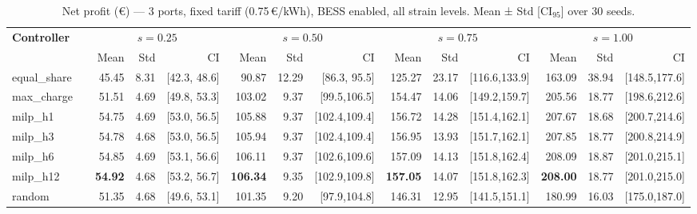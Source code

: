 \begin{table}[!htb]
\centering
\caption{Net profit (€) — 3 ports, fixed tariff (0.75\,€/kWh), BESS enabled,
         all strain levels. Mean ± Std [CI$_{95}$] over 30 seeds.}
\label{tab:gc_3port_fixed}
\setlength{\tabcolsep}{3pt}
\begin{tabular}{lp{1cm} rrr rrr rrr rrr}
\toprule
\textbf{Controller} & &
  \multicolumn{3}{c}{$s=0.25$} &
  \multicolumn{3}{c}{$s=0.50$} &
  \multicolumn{3}{c}{$s=0.75$} &
  \multicolumn{3}{c}{$s=1.00$} \\
\cmidrule(lr){3-5}\cmidrule(lr){6-8}\cmidrule(lr){9-11}\cmidrule(lr){12-14}
 & & Mean & Std & CI & Mean & Std & CI & Mean & Std & CI & Mean & Std & CI \\
\midrule
equal\_share & &  45.45 &  8.31 & [42.3, 48.6] &  90.87 & 12.29 & [86.3, 95.5] & 125.27 & 23.17 & [116.6,133.9] & 163.09 & 38.94 & [148.5,177.6] \\
max\_charge  & &  51.51 &  4.69 & [49.8, 53.3] & 103.02 &  9.37 & [99.5,106.5] & 154.47 & 14.06 & [149.2,159.7] & 205.56 & 18.77 & [198.6,212.6] \\
milp\_h1     & &  54.75 &  4.69 & [53.0, 56.5] & 105.88 &  9.37 & [102.4,109.4] & 156.72 & 14.28 & [151.4,162.1] & 207.67 & 18.68 & [200.7,214.6] \\
milp\_h3     & &  54.78 &  4.68 & [53.0, 56.5] & 105.94 &  9.37 & [102.4,109.4] & 156.95 & 13.93 & [151.7,162.1] & 207.85 & 18.77 & [200.8,214.9] \\
milp\_h6     & &  54.85 &  4.69 & [53.1, 56.6] & 106.11 &  9.37 & [102.6,109.6] & 157.09 & 14.13 & [151.8,162.4] & 208.09 & 18.87 & [201.0,215.1] \\
milp\_h12    & &  \textbf{54.92} &  4.68 & [53.2, 56.7] & \textbf{106.34} &  9.35 & [102.9,109.8] & \textbf{157.05} & 14.07 & [151.8,162.3] & \textbf{208.00} & 18.77 & [201.0,215.0] \\
random       & &  51.35 &  4.68 & [49.6, 53.1] & 101.35 &  9.20 & [97.9,104.8] & 146.31 & 12.95 & [141.5,151.1] & 180.99 & 16.03 & [175.0,187.0] \\
\bottomrule
\end{tabular}
\end{table}

